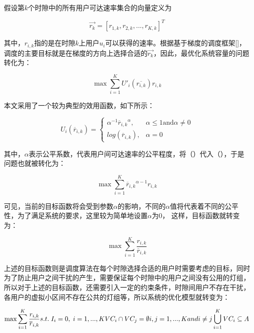 假设第$k$个时隙中的所有用户可达速率集合的向量定义为

\begin{equation}
    \overrightarrow {{r_k}}  = {[{r_{1,k}},{r_{2,k}},...,{r_{K,k}}]^T}
\end{equation}

其中，$r_{i,k}$指的是在时隙$k$上用户$u_{i}$可以获得的速率。根据基于梯度的调度框架[]，调度的主要目标就是在梯度的方向上选择合适的$\overrightarrow {{r_k}}$，因此，最优化系统容量的问题转化为：

\begin{equation}
    \max \sum\limits_{i = 1}^K {{{U'}_i}(\overline {{r_{i,k}}} )} {r_{i,k}}
\end{equation}

本文采用了一个较为典型的效用函数，如下所示：

\begin{equation}
    {U_i}(\overline {r}_{i,k}) =
    \begin{cases}
        \alpha^{-1} {\overline {r}_{i,k}}^\alpha ,  & \alpha \le 1 \mbox{and} \alpha \ne 0 \\
        log(\overline {r}_{i,k}),                   & \alpha = 0
    \end{cases}
\end{equation}

其中，$\alpha$表示公平系数，代表用户间可达速率的公平程度，将（）代入（），于是问题也就被转化为：

\begin{equation}
    \max \sum\limits_{i = 1}^K {{{\overline {r}_{i,k} }^{\alpha  - 1}}{r_{i,k}}}
\end{equation}

可见，当前的目标函数将会受到参数$\alpha$的影响，不同的$\alpha$值将代表着不同的公平性，为了满足系统的要求，这里较为简单地设置$\alpha$为0，
这样，目标函数就转变为：

\begin{equation}
    \max \sum\limits_{i = 1}^K {\frac{{{r_{i,k}}}}{{\overline {r}_{i,k} }}}
\end{equation}

上述的目标函数则是调度算法在每个时隙选择合适的用户时需要考虑的目标，同时为了防止用户之间干扰的产生，需要保证每个时隙中的用户之间没有公用的灯组，
所以对于上述的目标函数，还需要引入一定的约束条件，时隙间用户不存在干扰，各用户的虚拟小区间不存在公共的灯组等，所以系统的优化模型就转变为：

\begin{equation}
    \max \sum_{i=1}^{K}\frac{r_{i,k}}{\overline{r}_{i,k}} \\
    s.t.\; I_{i} = 0,\; i=1,...,K \\
        VC_{i} \cap VC_{j} = \emptyset  i,j= 1,...,K and i \ne j  \\
        \bigcup_{i = 1}^K V{C_i} \subseteq A
\end{equation}

